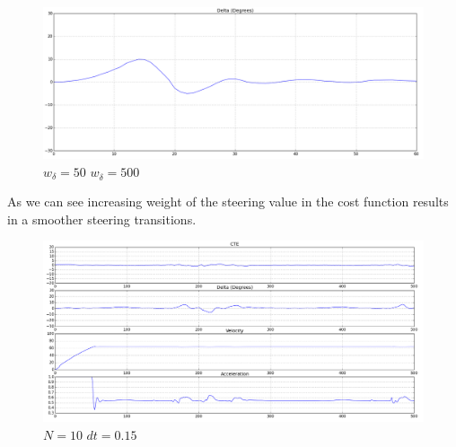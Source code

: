 \begin{figure}[H]
\centering
    \includegraphics[width=0.8\linewidth]{./delta_50_500.png}
    \vspace{-0.1cm}
\caption{$w_{\delta}=50$ $w_{\dot{\delta}}=500$}
\label{fig:fig3}
\end{figure}

As we can see increasing weight of the steering value in the cost function results in a smoother steering transitions.

\begin{figure}[H]
\centering
    \includegraphics[width=0.8\linewidth]{./figure4.png}
      \vspace{-0.1cm}
\caption{$N=10$ $dt=0.15$}
\label{fig:fig4}
\end{figure}

